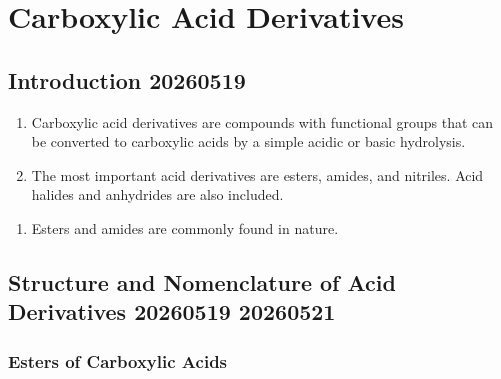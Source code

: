 \section{Carboxylic Acid Derivatives}

\subsection{Introduction 20260519}

\begin{enumerate}
    \item Carboxylic acid derivatives are compounds with functional groups that can be converted to carboxylic acids by a simple acidic or basic hydrolysis.
    \item The most important acid derivatives are esters, amides, and nitriles. Acid halides and anhydrides are also included.
\end{enumerate}
\chemnameinit{}
\begin{center}
     \quad 
     \quad
     \quad 
     \quad 
\end{center}
\begin{enumerate}[resume]
    \item Esters and amides are commonly found in nature.
\end{enumerate}

\subsection{Structure and Nomenclature of Acid Derivatives 20260519 20260521}

\subsubsection{Esters of Carboxylic Acids}

